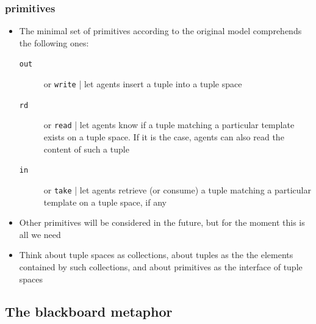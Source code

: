 \documentclass[presentation]{beamer}\mode<presentation>{\usetheme{AMSCesenaPurpleAndGold}}
\begin{document}
\begin{frame}%
\frametitle{ primitives}

\begin{itemize}
\item The minimal set of \alert{primitives} according to the original  model comprehends the following ones:
%

%
\begin{description}
	\item[\texttt{out}] or \alert{\texttt{write}} | let agents \alert{insert} a tuple into a tuple space 
	
	
	
	\item[\texttt{rd}] or \alert{\texttt{read}} | let agents know if a tuple matching a particular template \alert{exists} on a tuple space. 
	If it is the case, agents can also read the content of such a tuple
	
	
	
	\item[\texttt{in}] or \alert{\texttt{take}} | let agents \alert{retrieve} (or \alert{consume}) a tuple matching a particular template on a tuple space, if any
\end{description}



\item Other primitives will be considered in the future, but for the moment this is all we need



\item Think about tuple spaces as \alert{collections}, about tuples as the the elements contained by such collections, and about primitives as the \alert{interface} of tuple spaces

\end{itemize}

\end{frame}

\subsection{The blackboard metaphor} 
\end{document}
